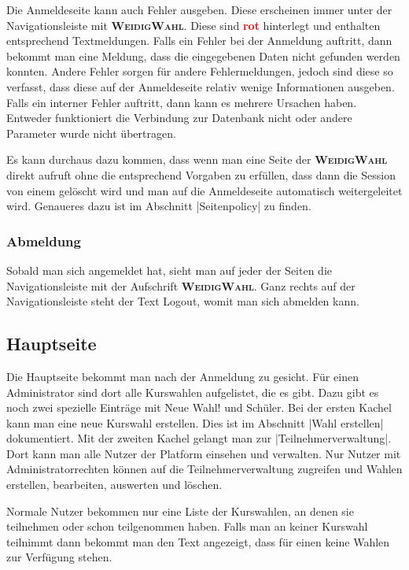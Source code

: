 \documentclass[ngerman]{ltxdoc}
\newcommand{\name}{\textbf{\textsc{WeidigWahl}}\xspace}
\begin{document}
Die Anmeldeseite kann auch Fehler ausgeben. Diese erscheinen immer unter der
Navigationsleiste mit \name. Diese sind \textcolor{red}{\textbf{rot}} hinterlegt
und enthalten entsprechend Textmeldungen. Falls ein Fehler bei der Anmeldung auftritt,
dann bekommt man eine Meldung, dass die eingegebenen Daten nicht gefunden werden konnten.
Andere Fehler sorgen für andere Fehlermeldungen, jedoch sind diese so verfasst,
dass diese auf der Anmeldeseite relativ wenige Informationen ausgeben. Falls ein
interner Fehler auftritt, dann kann es mehrere Ursachen haben. Entweder funktioniert
die Verbindung zur Datenbank nicht oder andere Parameter wurde nicht übertragen.

Es kann durchaus dazu kommen, dass wenn man eine Seite der \name direkt aufruft
ohne die entsprechend Vorgaben zu erfüllen, dass dann die Session von einem
gelöscht wird und man auf die Anmeldeseite automatisch weitergeleitet wird.
Genaueres dazu ist im Abschnitt |Seitenpolicy| zu finden.

\subsubsection{Abmeldung}

Sobald man sich angemeldet hat, sieht man auf jeder der Seiten die Navigationsleiste
mit der Aufschrift \name. Ganz rechts auf der Navigationsleiste steht der Text
\glqq Logout\grqq{}, womit man sich abmelden kann.

\subsection{Hauptseite}

Die Hauptseite bekommt man nach der Anmeldung zu gesicht. Für einen Administrator
sind dort alle Kurswahlen aufgelistet, die es gibt. Dazu gibt es noch zwei spezielle
Einträge mit \glqq Neue Wahl!\grqq{} und \glqq Schüler\grqq{}. Bei der ersten Kachel
kann man eine neue Kurswahl erstellen. Dies ist im Abschnitt |Wahl erstellen|
dokumentiert. Mit der zweiten Kachel gelangt man zur |Teilnehmerverwaltung|.
Dort kann man alle Nutzer der Platform einsehen und verwalten. Nur Nutzer mit
Administratorrechten können auf die Teilnehmerverwaltung zugreifen und Wahlen erstellen,
bearbeiten, auswerten und löschen.

Normale Nutzer bekommen nur eine Liste der Kurswahlen, an denen sie teilnehmen oder
schon teilgenommen haben. Falls man an keiner Kurswahl teilnimmt dann bekommt
man den Text angezeigt, dass für einen keine Wahlen zur Verfügung stehen.
\end{document}
